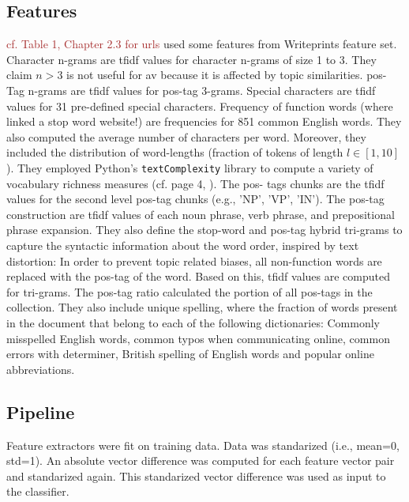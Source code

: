 \subsection{Features}
\textcolor{brown}{cf. Table 1, \citep{weerasinghe_feature_vector_difference_2021} Chapter 2.3 for urls}
\citet{weerasinghe_feature_vector_difference_2021} used some features from Writeprints feature set.
Character n-grams are \ac{tfidf} values for character n-grams of size 1 to 3.
They claim $n>3$ is not useful for \ac{av} because it is affected by topic similarities.
\ac{pos}-Tag n-grams are \ac{tfidf} values for \ac{pos}-tag 3-grams.
Special characters are \ac{tfidf} values for 31 pre-defined special characters.
Frequency of function words (where \citep{weerasinghe_feature_vector_difference_2021} linked a stop word website!) 
are frequencies for 851 common English words.
They also computed the average number of characters per word. %
Moreover, they included the distribution of word-lengths (fraction of tokens of length $l \in [1,10]$).
They employed Python's \texttt{textComplexity} library to compute a variety of vocabulary richness measures 
(cf. page 4, \citep{weerasinghe_feature_vector_difference_2021}).
The \ac{pos}- tags chunks are the \ac{tfidf} values for the second level \ac{pos}-tag chunks (e.g., 'NP', 'VP', 'IN').
The \ac{pos}-tag construction are \ac{tfidf} values of each noun phrase, verb phrase, and prepositional phrase expansion.
They also define the stop-word and \ac{pos}-tag hybrid tri-grams to capture the syntactic information about the word order, 
inspired by text distortion:
In order to prevent topic related biases, all non-function words are replaced with the \ac{pos}-tag of the word.
Based on this, \ac{tfidf} values are computed for tri-grams.
The \ac{pos}-tag ratio calculated the portion of all \ac{pos}-tags in the  collection.
They also include unique spelling, where the fraction of words present in the document that belong to each of the following dictionaries: 
Commonly misspelled English words, common typos when communicating online, common errors with determiner, 
British spelling of English words and popular online abbreviations.

\subsection{Pipeline}
Feature extractors were fit on training data.
Data was standarized (i.e., mean=0, std=1).
An absolute vector difference was computed for each feature vector pair and standarized again.
This standarized vector difference was used as input to the classifier.



